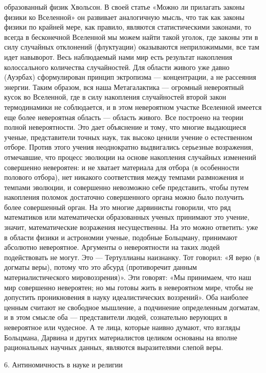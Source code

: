 образованный физик Хвольсон. В своей статье «Можно ли прилагать законы физики
ко Вселенной» он развивает аналогичную мысль, что так как законы физики по
крайней мере, как правило, являются статистическими законами, то всегда в
бесконечной Вселенной мы можем найти такой уголок, где законы эти в силу
случайных отклонений (флуктуации) оказываются неприложимыми, все там идет
навыворот. Весь наблюдаемый нами мир есть результат накопления колоссального
количества случайностей. Для области живого уже давно (Ауэрбах) сформулирован
принцип эктропизма --- концентрации, а не рассеяния энергии. Таким образом, вся
наша Метагалактика --- огромный невероятный кусок во Вселенной, где в силу
накопления случайностей второй закон термодинамики не соблюдается, и в этом
невероятном участке Вселенной имеется еще более невероятная область --- область
живого. Все построено на теории полной невероятности. Это дает объяснение и
тому, что многие выдающиеся ученые, представители точных наук, так высоко
ценили учение о естественном отборе. Против этого учения неоднократно
выдвигались серьезные возражения, отмечавшие, что процесс эволюции на основе
накопления случайных изменений совершенно невероятен: и не хватает материала
для отбора (в особенности полового отбора), нет никакого соответствия между
темпами размножения и темпами эволюции, и совершенно невозможно себе
представить, чтобы путем накопления поломок достаточно совершенного органа
можно было получить более совершенный орган. На это многие дарвинисты говорили,
что ряд математиков или математически образованных ученых принимают это учение,
значит, математические возражения несущественны. На это можно ответить: уже в
области физики и астрономии ученые, подобные Больцману, принимают абсолютно
невероятное. Аргументы о невероятности на таких людей подействовать не могут.
Это --- Тертуллианы наизнанку. Тот говорил: «Я верю (в догматы веры), потому что
это абсурд (противоречит данным материалистического мировоззрения)». Эти
говорят: «Мы принимаем, что наш мир совершенно невероятен; но мы готовы жить в
невероятном мире, чтобы не допустить проникновения в науку идеалистических
воззрений». Оба наиболее ценным считают не свободное мышление, а подчинение
определенным догматам, и в этом смысле оба --- представители людей, сознательно
верующих в невероятное или чудесное. А те лица, которые наивно думают, что
взгляды Больцмана, Дарвина и других материалистов целиком основаны на вполне
рациональных научных данных, являются выразителями слепой веры.

6. Антиномичность в науке и религии

